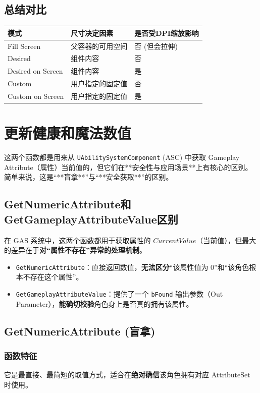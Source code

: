 \subsection{总结对比}
\begin{tabular}{|l|l|l|}
	\hline
	\textbf{模式} & \textbf{尺寸决定因素} & \textbf{是否受DPI缩放影响} \\
	\hline
	Fill Screen & 父容器的可用空间 & 否 (但会拉伸) \\
	\hline
	Desired & 组件内容 & 否 \\
	\hline
	Desired on Screen & 组件内容 & 是 \\
	\hline
	Custom & 用户指定的固定值 & 否 \\
	\hline
	Custom on Screen & 用户指定的固定值 & 是 \\
	\hline
\end{tabular}
\section{更新健康和魔法数值}
这两个函数都是用来从 \texttt{UAbilitySystemComponent} (ASC) 中获取 Gameplay Attribute（属性）当前值的，但它们在**安全性与应用场景**上有核心的区别。简单来说，这是“**盲拿**”与“**安全获取**”的区别。


\subsection{GetNumericAttribute和GetGameplayAttributeValue区别}
在 GAS 系统中，这两个函数都用于获取属性的 $CurrentValue$（当前值），但最大的差异在于\textbf{对“属性不存在”异常的处理机制}。

\begin{itemize}
	\item \texttt{GetNumericAttribute}：直接返回数值，\textbf{无法区分}“该属性值为 0”和“该角色根本不存在这个属性”。
	\item \texttt{GetGameplayAttributeValue}：提供了一个 \texttt{bFound} 输出参数（Out Parameter），\textbf{能确切校验}角色身上是否真的拥有该属性。
\end{itemize}

\subsection{GetNumericAttribute (盲拿)}

\subsubsection{函数特征}
它是最直接、最简短的取值方式，适合在\textbf{绝对确信}该角色拥有对应 AttributeSet 时使用。


